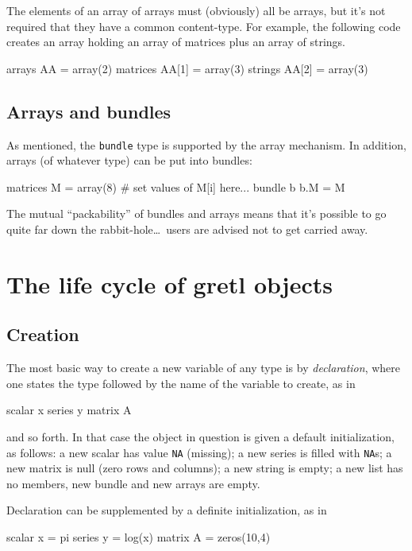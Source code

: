 The elements of an array of arrays must (obviously) all be arrays, but
it's not required that they have a common content-type. For example,
the following code creates an array holding an array of matrices plus
an array of strings.
\begin{code}
arrays AA = array(2)
matrices AA[1] = array(3)
strings AA[2] = array(3)
\end{code}

\subsection{Arrays and bundles}

As mentioned, the \texttt{bundle} type is supported by the array
mechanism. In addition, arrays (of whatever type) can be put into
bundles:
\begin{code}
matrices M = array(8)
# set values of M[i] here...
bundle b
b.M = M
\end{code}

The mutual ``packability'' of bundles and arrays means that it's
possible to go quite far down the rabbit-hole\dots\ users are advised
not to get carried away.

\section{The life cycle of gretl objects}

\subsection{Creation}

The most basic way to create a new variable of any type is by
\textit{declaration}, where one states the type followed by the name
of the variable to create, as in

\begin{code}
scalar x
series y
matrix A
\end{code}

and so forth. In that case the object in question is given a default
initialization, as follows: a new scalar has value \texttt{NA}
(missing); a new series is filled with \texttt{NA}s; a new matrix is
null (zero rows and columns); a new string is empty; a new list has no
members, new bundle and new arrays are empty.

Declaration can be supplemented by a definite initialization, as in

\begin{code}
scalar x = pi
series y = log(x)
matrix A = zeros(10,4)
\end{code}

